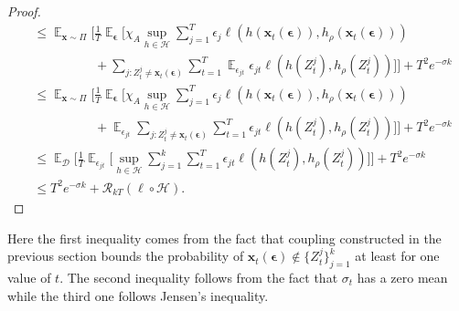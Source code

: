 \begin{proof}
\begin{align}
    &\leq \mathop{\mathbb{E}}_{\mathbf{x} \sim \Pi} \Big[\frac{1}{T} \mathop{\mathbb{E}}_{\boldsymbol{\epsilon}} \Big[ \chi_A \sup_{h \in \mathcal{H}} \sum_{j=1}^T \epsilon_j \ell (h(\mathbf{x}_t(\boldsymbol{\epsilon})), h_\rho (\mathbf{x}_t(\boldsymbol{\epsilon}))) \nonumber \\
    &\hspace{2cm}+  \sum_{j : Z_t^j \neq \mathbf{x}_t(\boldsymbol{\epsilon})} \sum_{t=1}^T \mathop{\mathbb{E}}_{\epsilon_{jt}} \epsilon_{jt} \ell (h(Z_t^j), h_\rho (Z_t^j)) \Big] \Big] + T^2 e^{-\sigma k} \nonumber \\
    &\leq  \mathop{\mathbb{E}}_{\mathbf{x} \sim \Pi} \Big[\frac{1}{T} \mathop{\mathbb{E}}_{\boldsymbol{\epsilon}} \Big[ \chi_A \sup_{h \in \mathcal{H}} \sum_{j=1}^T \epsilon_j \ell (h(\mathbf{x}_t(\boldsymbol{\epsilon})), h_\rho (\mathbf{x}_t(\boldsymbol{\epsilon}))) \nonumber \\
    &\hspace{2cm}+ \mathop{\mathbb{E}}_{\epsilon_{jt}} \sum_{j : Z_t^j \neq \mathbf{x}_t(\boldsymbol{\epsilon})} \sum_{t=1}^T  \epsilon_{jt} \ell (h(Z_t^j), h_\rho (Z_t^j)) \Big] \Big] + T^2 e^{-\sigma k} \nonumber \\
    &\leq \mathop{\mathbb{E}}_{\mathcal{D}} \Big[ \frac{1}{T} \mathop{\mathbb{E}}_{\epsilon_{jt}} \Big[ \sup_{h \in \mathcal{H}} \sum_{j = 1}^k \sum_{t = 1}^T \epsilon_{jt} \ell (h(Z_t^j), h_\rho (Z_t^j)) \Big] \Big] + T^2 e^{-\sigma k} \nonumber \\
    &\leq T^2 e^{-\sigma k} + \mathcal{R}_{kT} (\ell \circ \mathcal{H}).
\end{align}
\end{proof}
Here the first inequality comes from the fact that coupling constructed in the previous section bounds the probability of $\mathbf{x}_t (\boldsymbol{\epsilon}) \notin \{Z_t^j\}_{j=1}^k$ at least for one value of $t$. The second inequality follows from the fact that $\sigma_t$ has a zero mean while the third one follows Jensen's inequality.

